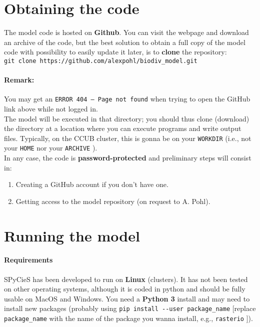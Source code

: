 \documentclass[a4paper, 11pt]{article}
\newcommand\code[1]{%
\texttt{#1}%
}
\begin{document}
\section{Obtaining the code}

The model code is hosted on \textbf{Github}. You can visit the webpage and download an archive of the code, but the best solution to obtain a full copy of the model code with possibility to easily update it later, is to \textbf{clone} the repository:\\

\code{git clone https://github.com/alexpohl/biodiv\_model.git}

\paragraph{Remark:} You may get an \code{ERROR 404 -- Page not found} when trying to open the GitHub link above while not logged in.\\

The model will be executed in that directory; you should thus clone (download) the directory at a location where you can execute programs and write output files. Typically, on the CCUB cluster, this is gonna be on your \code{WORKDIR} (i.e., not your \code{HOME} nor your \code{ARCHIVE}).\\

In any case, the code is \textbf{password-protected} and preliminary steps will consist in:
\begin{enumerate}
    \item Creating a GitHub account if you don't have one.
    \item Getting access to the model repository (on request to A. Pohl).
\end{enumerate}

\section{Running the model}

\paragraph{Requirements} SPyCieS has been developed to run on \textbf{Linux} (clusters). It has not been tested on other operating systems, although it is coded in python and should be fully usable on MacOS and Windows. You need a \textbf{Python 3} install and may need to install new packages (probably using \code{pip install -{}-user package\_name} [replace \code{package\_name} with the name of the package you wanna install, e.g., \code{rasterio}]).
\end{document}
